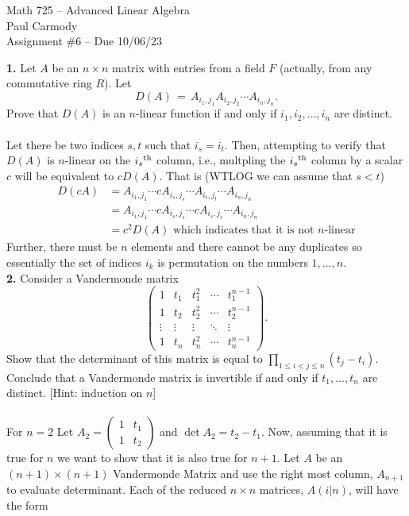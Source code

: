 \documentclass[11pt]{amsart}
\theoremstyle{definition}  %
\begin{document}
\newcommand{\ts}{\textsuperscript}

\begin{center}
\Large{Math 725 -- Advanced Linear Algebra}\\
\large{Paul Carmody}\\
Assignment \#6 -- Due 10/06/23
\end{center}

\vskip 1.0cm

\noindent
{\bf 1.} Let $A$ be an $n \times n$ matrix with entries from a field $F$ (actually, from any commutative ring $R$). Let 
$$ D(A)  \, = \, A_{i_1, j_1} A_{i_2, j_2} \cdots A_{i_n, j_n}.$$
Prove that $D(A)$ is an $n$-linear function if and only if $i_1, i_2, \ldots, i_n$ are distinct. \\
\\
Let there be two indices $s, t$ such that $i_s=i_t$.  Then, attempting to verify that $D(A)$ is $n$-linear on the $i_s\ts{th}$ column, i.e., multpling the $i_s\ts{th}$ column by a scalar $c$ will be equivalent to $cD(A)$.  That is (WTLOG we can assume that $s<t$)
\begin{align*}
	D(cA) &= A_{i_1, j_1} \cdots cA_{i_s,j_s}\cdots A_{i_t,j_t} \cdots A_{i_n, j_n} \\
	&= A_{i_1, j_1} \cdots cA_{i_s,j_s}\cdots cA_{i_s,j_s} \cdots A_{i_n, j_n}\\
	&= c^2D(A) \text{ which indicates that it is not $n$-linear}
\end{align*}Further, there must be $n$ elements and there cannot be any duplicates so essentially the set of indices $i_k$ is permutation on the numbers $1,\dots,n$.
\\
\vskip 0.1cm
\noindent
{\bf 2.}  Consider a Vandermonde matrix
$$\left( \begin{array}{ccccc} 1 & t_1 & t_1^2 & \cdots & t_1^{n-1} \\
1 & t_2 & t_2^2 & \cdots & t_2^{n-1} \\
\vdots & \vdots & \vdots & \ddots & \vdots \\
1 & t_n & t_n^2 & \cdots & t_n^{n-1} 
\end{array} \right).$$
Show that the determinant of this matrix is equal to $\prod_{1 \leq i < j \leq n} (t_j - t_i)$. Conclude that a Vandermonde matrix is invertible if and only if $t_1, \ldots, t_n$ are
distinct. [Hint: induction on $n$]\\
\\
For $n=2$  Let $A_2=\begin{pmatrix}
 1 & t_1 \\
 1 & t_2
\end{pmatrix}$ and $\det A_2 = t_2-t_1$.  Now, assuming that it is true for $n$ we want to show that it is also true for $n+1$.  Let $A$ be an $(n+1)\times(n+1)$ Vandermonde Matrix and use the right most column, $A_{n+1}$ to evaluate determinant.  Each of the reduced $n\times n$ matrices, $A(i|n)$, will have the form
\end{document}
